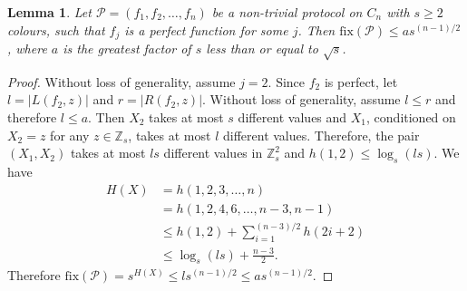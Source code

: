 \documentclass{birkjour}
\newtheorem{lem}[thm]{Lemma}
\theoremstyle{indenteddefinition}
\theoremstyle{indenteddefinition}
\numberwithin{equation}{section}
\renewcommand{\Pr}{\mathcal{P}}
\newcommand{\Z}{\mathbb{Z}}
\newcommand{\fix}{\mbox{fix}}
\begin{document}
\begin{lem}
\label{lem:one_perfect_function}
Let $\Pr = (f_1,f_2, \ldots ,f_n)$ be a non-trivial protocol on $C_n$ with $s \geq 2$ colours, such that $f_j$ is a perfect function for some $j$. Then $\fix(\Pr) \leq as^{(n-1)/2}$, where $a$ is the greatest factor of $s$ less than or equal to $\sqrt{s}$.
\end{lem}
\begin{proof}
Without loss of generality, assume $j=2$. Since $f_2$ is perfect, let $l = |L(f_2,z)|$ and $r=|R(f_2,z)|$. Without loss of generality, assume $l \leq r$ and therefore $l \leq a$. Then $X_2$ takes at most $s$ different values and $X_1$, conditioned on $X_2=z$ for any $z \in \Z_s$, takes at most $l$ different values. Therefore, the pair $(X_1,X_2)$ takes at most $ls$ different values in $\Z_s^2$ and $h(1,2) \leq \log_s(ls)$. We have
	\begin{align*}
	H(X) & = h(1,2,3, \ldots ,n) \\
	& = h(1,2,4,6, \ldots ,n-3,n-1) \\
	& \leq h(1,2) + \sum_{i=1}^{(n-3)/2} h(2i+2) \\
	& \leq \log_s(ls) + \frac{n-3}{2}. 
	\end{align*}
Therefore $\fix(\Pr) = s^{H(X)} \leq ls^{(n-1)/2} \leq as^{(n-1)/2}$.
\end{proof}
\end{document}
